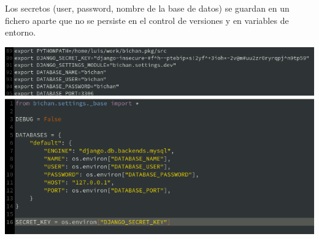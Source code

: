 \documentclass{report}
\begin{document}
Los secretos (user, password, nombre de la base de datos) se guardan en un fichero aparte que no se persiste en el control de versiones y en variables de entorno.

\includegraphics[scale=0.5]{env}
\includegraphics[scale=0.5]{settings}
\end{document}
